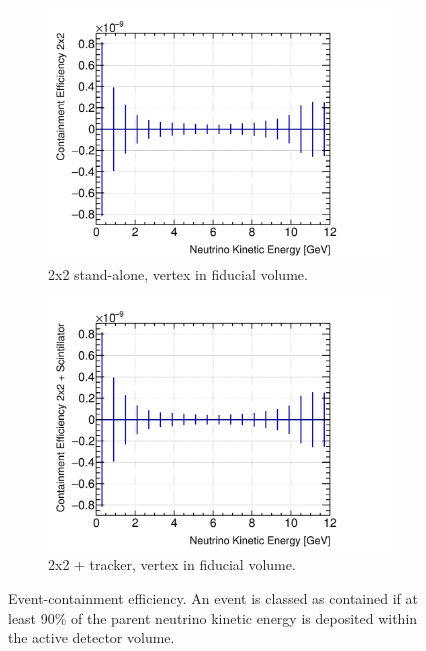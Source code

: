\documentclass[10pt,a4paper,openany]{article}
\begin{document}
\begin{figure}[htbp]
\begin{subfigure}[b]{0.49\textwidth}
    \includegraphics[width=1.0\textwidth]{E_cont_eff_2x2_fiducial.png}
		\caption{2x2 stand-alone, vertex in fiducial volume.}
		\label{}
	\end{subfigure}	
	\hfill
	\begin{subfigure}[b]{0.49\textwidth}
		\centering
		\includegraphics[width=1.0\textwidth]{E_cont_eff_2x2_Scintillator_fiducial_gap.png}
		\caption{2x2 + tracker, vertex in fiducial volume.}
		\label{}
	\end{subfigure}
  \caption{Event-containment efficiency. An event is classed as contained if at least 90\% of the parent neutrino kinetic energy is deposited within the active detector volume.}
\end{figure}
\end{document}
